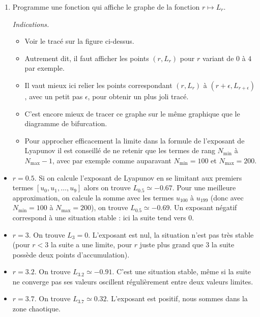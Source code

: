 \documentclass[11pt,class=report,crop=false]{standalone}
\begin{document}
\begin{activite}
\begin{enumerate}
  \item Programme une fonction  qui 
  affiche le graphe de la fonction $r \mapsto L_r$.
  
  \emph{Indications.}
\begin{itemize}
  \item Voir le tracé sur la figure ci-dessus.

  \item Autrement dit, il faut afficher les points $(r,L_r)$ pour $r$ variant de $0$ à $4$ par exemple.
  
  \item Il vaut mieux ici relier les points correspondant $(r,L_r)$ à $(r+\epsilon,L_{r+\epsilon})$, avec un petit pas $\epsilon$, pour obtenir un plus joli tracé.
  
  \item C'est encore mieux de tracer ce graphe sur le même graphique que le diagramme de bifurcation.
  
  \item Pour approcher efficacement la limite dans la formule de l'exposant de Lyapunov il est conseillé de ne retenir que les termes de rang $N_{\min}$ à $N_{\max}-1$, avec par exemple 
comme auparavant  $N_{\min}=100$ et $N_{\max}=200$.
\end{itemize}  
  
  
\end{enumerate} 



\begin{itemize}
  \item $r=0.5$. Si on calcule l'exposant de Lyapunov en se limitant aux premiers termes $[u_0,u_1,\ldots,u_{9}]$ alors on trouve $L_{0.5} \simeq -0.67$.
  Pour une meilleure approximation, on calcule la somme avec les termes $u_{100}$ à $u_{199}$ (donc avec $N_{\min}=100$ à $N_{\max}=200$), on trouve $L_{0.5} \simeq -0.69$.
  Un exposant négatif correspond à une situation stable : ici la suite tend vers $0$. 
  
  \item $r=3$. On trouve $L_3 = 0$. L'exposant est nul, la situation n'est pas très stable (pour $r<3$ la suite a une limite, pour $r$ juste plus grand que $3$ la suite possède deux points d'accumulation).
  
    \item $r=3.2$. On trouve $L_{3.2} \simeq -0.91$. C'est une situation stable, même si la suite ne converge pas ses valeurs oscillent régulièrement entre deux valeurs limites.
  
  \item $r=3.7$. On trouve $L_{3.7} \simeq 0.32$. L'exposant est positif, nous sommes dans la zone chaotique.
  
\end{itemize}

\end{activite}
\end{document}
